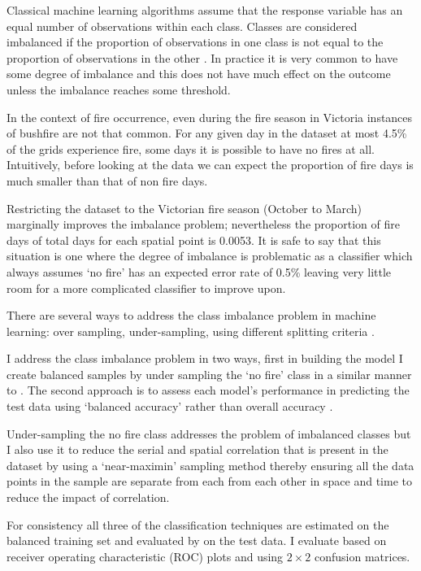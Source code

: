 \documentclass[11pt,a4paper]{article}
\begin{document}
Classical machine learning algorithms assume that the response variable has an equal number of observations within each class. Classes are considered imbalanced if the proportion of observations in one class is not equal to the proportion of observations in the other \citep{japkowicz00}. In practice it is very common to have some degree of imbalance and this does not have much effect on the outcome unless the imbalance reaches some threshold.

In the context of fire occurrence, even during the fire season in Victoria instances of bushfire are not that common. For any given day in the dataset at most 4.5\% of the grids experience fire, some days it is possible to have no fires at all. Intuitively, before looking at the data we can expect the proportion of fire days is much smaller than that of non fire days.

Restricting the dataset to the Victorian fire season (October to March) marginally improves the imbalance problem; nevertheless the proportion of fire days of total days for each spatial point is 0.0053. It is safe to say that this situation is one where the degree of imbalance is problematic as a classifier which always assumes `no fire' has an expected error rate of 0.5\% leaving very little room for a more complicated classifier to improve upon.

There are several ways to address the class imbalance problem in machine learning: over sampling, under-sampling, using different splitting criteria \citep{japkowicz00}.

I address the class imbalance problem in two ways, first in building the model I create balanced samples by under sampling the `no fire' class in a similar manner to \citep{padilla11}.  The second approach is to assess each model's performance in predicting the test data using `balanced accuracy' rather than overall accuracy \citep{mosley13, japkowicz00}.

Under-sampling the no fire class addresses the problem of imbalanced classes but I also use it to reduce the serial and spatial correlation that is present in the dataset by using a `near-maximin' sampling method thereby ensuring all the data points in the sample are separate from each from each other in space and time to reduce the impact of correlation.

For consistency all three of the classification techniques are estimated on the balanced training set and evaluated by  on the test data. I evaluate based on receiver operating characteristic (ROC) plots  and using $2\times2$ confusion matrices.
\end{document}
